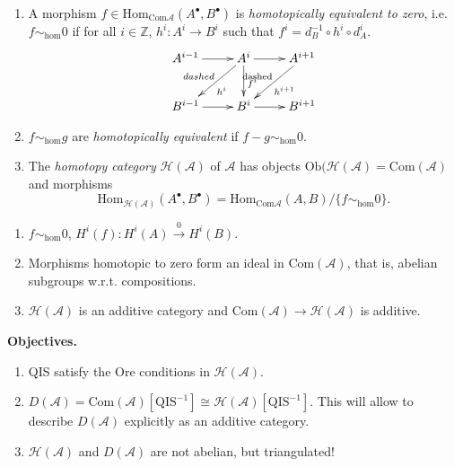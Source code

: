 \begin{definition}
\label{definition-homotopy-category}
\begin{enumerate}
\item 
A morphism $f \in \text{Hom}_{\text{Com}\mathcal{A}}(A^{\bullet},B^{\bullet})$
is {\it homotopically equivalent to zero}, i.e. $f \sim_{\text{hom}}0$ if for
all $i\in \mathbb{Z}$, $h^i:A^i \to B^i$ such that 
$f^i=d_B^{-1}\circ h^i \circ d_A^i$.
$$
\xymatrix{
A^{i-1}\ar[r]&
A^{i}\ar[r]\ar[dl]_{dashed}^{h^i}\ar[d]^{f^i}&
A^{i+1}\ar[dl]_{\text{dashed}}^{h^{i+1}}\\
B^{i-1}\ar[r]& B^i\ar[r]& B^{i+1}
}
$$
\item $f\sim_{\text{hom}}g$ are {\it homotopically equivalent} if $f-g
\sim_{\text{hom}}0$.
\item The {\it homotopy category}  $\mathcal{H}(\mathcal{A})$ of $\mathcal{A}$
has objects $\text{Ob}(\mathcal{H}(\mathcal{A})=\text{Com}(\mathcal{A})$ and
morphisms
$$
\text{Hom}_{\mathcal{H}(\mathcal{A})}(A^{\bullet},B^{\bullet})
=\text{Hom}_{\text{Com}\mathcal{A}}(A,B )\Big/\{f\sim_{\text{hom}}0\}.
$$
\end{enumerate}
\end{definition}

\begin{exercise}
\label{exercise-homotopy-category}
\begin{enumerate}
\item $f\sim_{\text{hom}}0$, $H^i(f):H^i(A)\xrightarrow{0}H^i(B)$.
\item Morphisms homotopic to zero form an ideal in $\text{Com}(\mathcal{A})$,
that is, abelian subgroups w.r.t. compositions.
\item $\mathcal{H}(\mathcal{A})$ is an additive category and
$\text{Com}(\mathcal{A}) \to \mathcal{H}(\mathcal{A})$ is additive.
\end{enumerate}
\end{exercise}

{\bf Objectives.}
\begin{enumerate}
\item QIS satisfy the Ore conditions in $\mathcal{H}(\mathcal{A})$.
\item $D(\mathcal{A})=\text{Com}(\mathcal{A})[\text{QIS}^{-1}]
\cong \mathcal{H}(\mathcal{A})[\text{QIS}^{-1}]$. This will allow to describe
$D(\mathcal{A})$ explicitly as an additive category.
\item $\mathcal{H}(\mathcal{A})$ and $D(\mathcal{A})$ are not abelian, but
triangulated!
\end{enumerate}

